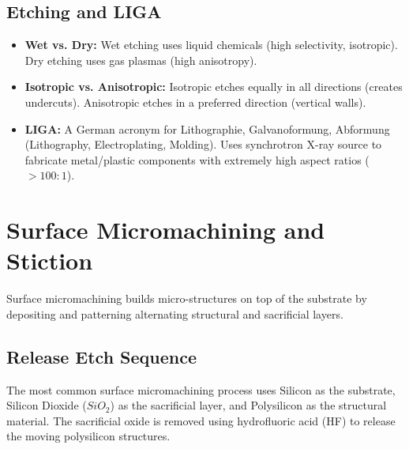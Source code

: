 \documentclass[12pt,a4paper]{article}
\begin{document}
\subsection{Etching and LIGA}
\begin{itemize}[leftmargin=*, itemsep=3.5pt]
  \item \textbf{Wet vs. Dry:} Wet etching uses liquid chemicals (high selectivity, isotropic). Dry etching uses gas plasmas (high anisotropy).
  \item \textbf{Isotropic vs. Anisotropic:} Isotropic etches equally in all directions (creates undercuts). Anisotropic etches in a preferred direction (vertical walls).
  \item \textbf{LIGA:} A German acronym for Lithographie, Galvanoformung, Abformung (Lithography, Electroplating, Molding). Uses synchrotron X-ray source to fabricate metal/plastic components with extremely high aspect ratios ($>100:1$).
\end{itemize}

\section{Surface Micromachining and Stiction}

Surface micromachining builds micro-structures on top of the substrate by depositing and patterning alternating structural and sacrificial layers.

\subsection{Release Etch Sequence}
The most common surface micromachining process uses Silicon as the substrate, Silicon Dioxide ($SiO_2$) as the sacrificial layer, and Polysilicon as the structural material. The sacrificial oxide is removed using hydrofluoric acid (HF) to release the moving polysilicon structures.
\end{document}
